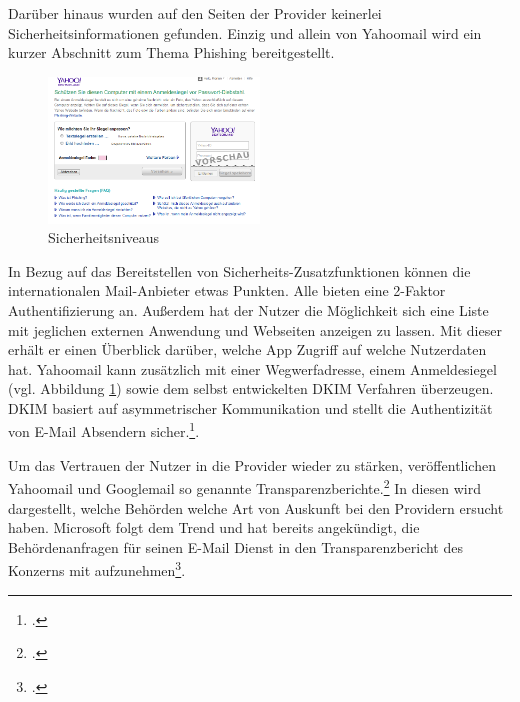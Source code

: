\documentclass  [paper=a4,
				fontsize=12pt,
				listof=totoc,
				bibliography=totoc
				]{scrreprt}
\begin{document}
			Darüber hinaus wurden auf den Seiten der Provider keinerlei Sicherheitsinformationen gefunden. Einzig und allein von Yahoomail wird ein kurzer Abschnitt zum Thema Phishing bereitgestellt.
			
			\begin{figure} %
							\includegraphics[width=0.5\textwidth]{images/yahoo_anmeldesiegel.png}
							\caption {Sicherheitsniveaus}
							\label{fig:Yahoo_Anmeldesiegel}	
						\end{figure}
			In Bezug auf das Bereitstellen von Sicherheits-Zusatzfunktionen können die internationalen Mail-Anbieter etwas Punkten. Alle bieten eine 2-Faktor Authentifizierung an. Außerdem hat der Nutzer die Möglichkeit sich eine Liste mit jeglichen externen Anwendung und Webseiten anzeigen zu lassen. Mit dieser erhält er einen Überblick darüber, welche App Zugriff auf welche Nutzerdaten hat.
			Yahoomail kann zusätzlich mit einer Wegwerfadresse, einem Anmeldesiegel (vgl. Abbildung \ref{fig:Yahoo_Anmeldesiegel}) sowie dem selbst entwickelten \ac{DKIM} Verfahren überzeugen. \ac{DKIM} basiert auf asymmetrischer Kommunikation und stellt die Authentizität von E-Mail Absendern sicher.\footcite[Vgl.][]{DKIM}.
			
			
			
			\medskip
			
			Um das Vertrauen der Nutzer in die Provider wieder zu stärken, veröffentlichen Yahoomail und Googlemail  so genannte Transparenzberichte.\footcite[Vgl.][]{Lokshin} In diesen wird dargestellt, welche Behörden welche Art von Auskunft bei den Providern ersucht haben. Microsoft folgt dem Trend und hat bereits angekündigt, die Behördenanfragen für seinen E-Mail Dienst in den Transparenzbericht des Konzerns mit aufzunehmen\footcite[Vgl.][]{Herget}.
			\medskip			
		
\end{document}
